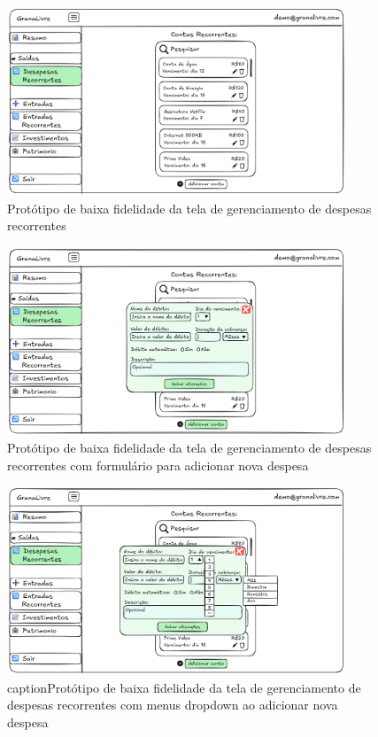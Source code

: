 \begin{figure}[H]
    \centering
    \includegraphics[width=0.9\textwidth]{imgs/04-despesas_recorrentes.png}
    \caption{Protótipo de baixa fidelidade da tela de gerenciamento de despesas recorrentes}
    \label{fig:prot_despesas_recorrentes}
\end{figure}

\begin{figure}[H]
    \centering
    \includegraphics[width=0.9\textwidth]{imgs/04-despesas_recorrentes_1.png}
    \caption{Protótipo de baixa fidelidade da tela de gerenciamento de despesas recorrentes com formulário para adicionar nova despesa}
    \label{fig:prot_despesas_recorrentes1}
\end{figure}

\begin{figure}[H]
    \centering
    \includegraphics[width=0.9\textwidth]{imgs/04-despesas_recorrentes_2.png}
    caption{Protótipo de baixa fidelidade da tela de gerenciamento de despesas recorrentes com menus dropdown ao adicionar nova despesa}
    \label{fig:prot_despesas_recorrentes2}
\end{figure}

